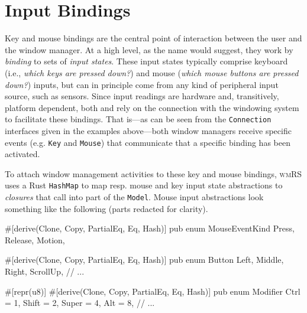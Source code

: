 \section{Input Bindings}


Key and mouse bindings are the central point of interaction between the user and
the window  manager. At a high  level, as the  name would suggest, they  work by
\textit{binding} to sets of \textit{input  states}. These input states typically
comprise  keyboard  (i.e., \textit{which  keys  are  pressed down?})  and  mouse
(\textit{which mouse  buttons are pressed  down?}) inputs, but can  in principle
come from  any kind  of peripheral  input source, such  as sensors.  Since input
readings  are hardware  and, transitively,  platform dependent,  both \wmrs  and
\wmcpp rely  on the  connection with  the windowing  system to  facilitate these
bindings. That is---as can be seen from the \texttt{Connection} interfaces given
in  the examples  above---both  window managers  receive  specific events  (e.g.
\texttt{Key} and  \texttt{Mouse}) that communicate  that a specific  binding has
been activated.

To  attach  window  management  activities  to these  key  and  mouse  bindings,
\textsc{wmRS} uses a Rust \texttt{HashMap}  to map resp. mouse and key
input  state  abstractions to  \textit{closures}  that  call  into part  of  the
\texttt{Model}.  Mouse  input abstractions  look  something  like the  following
(parts redacted for clarity).

\begin{rustblock}
  #[derive(Clone, Copy, PartialEq, Eq, Hash)]
  pub enum MouseEventKind {
    Press, Release, Motion,
  }
\end{rustblock}

\begin{rustblock}
  #[derive(Clone, Copy, PartialEq, Eq, Hash)]
  pub enum Button {
    Left, Middle, Right, ScrollUp, // ...
  }
\end{rustblock}
\begin{rustblock}
  #[repr(u8)]
  #[derive(Clone, Copy, PartialEq, Eq, Hash)]
  pub enum Modifier {
    Ctrl = 1, Shift = 2, Super = 4, Alt = 8,
    // ...
  }
\end{rustblock}

